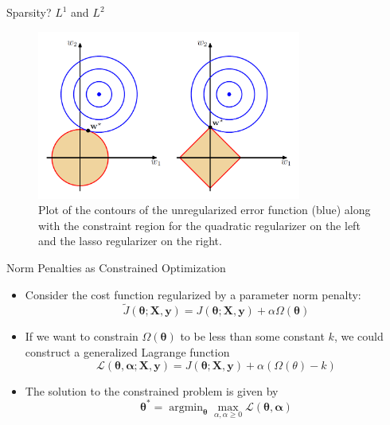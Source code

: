 \documentclass[10pt]{beamer}
\begin{document}
	\begin{frame}{Sparsity? $L^1$ and $L^2$}
		\begin{figure}
			\includegraphics[height=15em]{figures/prml-l1-l2-contours.png}
			\caption{Plot of the contours of the unregularized error function (blue) along with the constraint region for the quadratic regularizer on the left and the lasso regularizer on the right.}
		\end{figure}
	\end{frame}
	
	\begin{frame}{Norm Penalties as Constrained Optimization}
		\begin{itemize}
			\item Consider the cost function regularized by a parameter norm penalty:
			$$\tilde{J}(\bm{\theta};\bm{X},\bm{y})=J(\bm{\theta};\bm{X},\bm{y})+\alpha\Omega(\bm{\theta})$$
			
			\pause
			\item If we want to constrain $\Omega(\bm{\theta})$ to be less than some constant $k$, we could construct a generalized Lagrange function
			$$\mathcal{L}(\bm{\theta,\alpha;\bm{X},\bm{y}})=J(\bm{\theta};\bm{X},\bm{y})+\alpha(\Omega(\theta)-k)$$
			
			\pause
			\item The solution to the constrained problem is given by
			$$\bm{\theta}^*=\mathop{\arg\min}_{\bm{\theta}}\mathop{\max}_{\alpha,\alpha\geq0}\mathcal{L}(\bm{\theta,\alpha}) $$
		\end{itemize}
	\end{frame}
\end{document}
